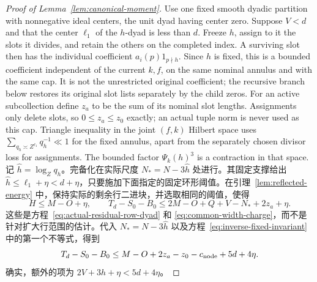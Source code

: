 \documentclass[11pt,a4paper]{article}
\numberwithin{equation}{section}
\numberwithin{figure}{section}
\theoremstyle{definition}
\theoremstyle{remark}
\begin{document}
\begin{proof}[Proof of Lemma~\ref{lem:canonical-moment}]
Use one fixed smooth dyadic partition with nonnegative ideal centers,
the unit dyad having center zero.  Suppose \(V<d\) and that the center
\(\ell_1\) of the \(h\)-dyad is less than \(d\).  Freeze \(h\), assign
to it the slots it divides, and retain the others on the completed
index.  A surviving slot then has the individual coefficient
\(a_i(p)1_{p\nmid h}\).  Since \(h\) is fixed, this is a bounded
coefficient independent of the current \(k,f\), on the same nominal
annulus and with the same cap.  It is not the unrestricted original
coefficient; the recursive branch below restores its original slot
lists separately by the child zeros.  For an active subcollection define \(z_a\) to be the sum of its
nominal slot lengths.  Assignments only delete slots, so
\(0\le z_a\le z_0\) exactly; an actual tuple norm is never used as this
cap.  Triangle inequality in the joint \((f,k)\) Hilbert space uses
\(\sum_{q_h\asymp Z^{\ell_1}}q_h^{-1}\ll1\) for the fixed annulus,
apart from the separately chosen divisor loss for assignments.  The
bounded factor \(\Psi_k(h)^3\) is a contraction in that space.记 \(\widehat h=\log_Zq_h\)。完备化在实际尺度
\(N_*=N-3\widehat h\) 处进行。其固定支撑给出
\(\widehat h\le\ell_1+\eta<d+\eta\)，只要施加下面指定的固定环形阈值。在引理~\ref{lem:reflected-energy} 中，保持实际的剩余行二进块，并选取相同的阈值，使得
\begin{equation}\label{eq:inverse-terminal-width}
 H\le M-O+\eta,\qquad
 T_d-S_0-B_0\le2M-O+Q+V-N_*+2z_a+\eta.
\end{equation}
这些是方程~\eqref{eq:actual-residual-row-dyad} 和
\eqref{eq:common-width-charge}，而不是针对扩大行范围的估计。代入 \(N_*=N-3\widehat h\) 以及方程~\eqref{eq:inverse-fixed-invariant} 中的第一个不等式，得到
\begin{equation}\label{old-eq:4.9}
 T_d-S_0-B_0
 \le M-O+2z_a-z_0-c_{\rm node}+5d+4\eta.
\end{equation}
确实，额外的项为 \(2V+3\widehat h+\eta<5d+4\eta\)。


\end{proof}
\end{document}
